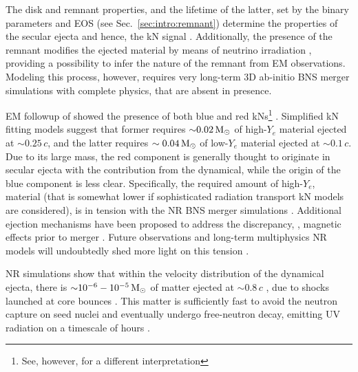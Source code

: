 The \pmerg{} disk and remnant properties, and the lifetime of the latter, set by the 
binary parameters and \ac{EOS} (see Sec.~\ref{sec:intro:remnant}) \citep{Radice:2018xqa,Perego:2019adq} 
determine the properties of the secular ejecta and hence, the \ac{kN} signal 
\citep[\eg][]{Radice:2018pdn}.
Additionally, the presence of the remnant modifies the ejected material by means of 
neutrino irradiation \citep{Fernandez:2015use}, providing a possibility to infer the nature of 
the remnant from \ac{EM} observations. Modeling this process, however, requires very long-term 
$3$D ab-initio \ac{BNS} merger simulations with complete physics, that are absent in presence.

\ac{EM} followup of \GW{} showed the presence of both blue and red \acp{kN}\footnote{
    See, however, \citet{Waxman:2017sqv} for a different interpretation
} \citep{Villar:2017wcc}.
Simplified \ac{kN} fitting models suggest that former requires ${\sim}0.02\,{\text{M}_{\odot}}$ of high-$Y_e$ 
material ejected at ${\sim0.25}\,c$, and the latter requires ${\sim0.04\,{\text{M}_{\odot}}}$ of low-$Y_e$ 
material ejected at ${\sim0.1}\,c$. Due to its large mass, the red component is 
generally thought to originate in secular ejecta with the contribution from the dynamical, while 
the origin of the blue component is less clear. Specifically, the required amount of high-$Y_e$,
material (that is somewhat lower if sophisticated radiation transport \ac{kN} models are considered),
is in tension with the \ac{NR} \ac{BNS} merger simulations 
\citep{Sekiguchi:2016bjd,Siegel:2019mlp,Perego:2017wtu,Kawaguchi:2018ptg}.
Additional ejection mechanisms have been proposed to address the discrepancy, \eg, 
magnetic effects prior to merger \citep{Metzger:2018qfl,Fernandez:2018kax,Radice:2018ghv}. 
Future observations and long-term multiphysics \ac{NR} models will undoubtedly shed more light on this tension \citep{Metzger:2018qfl}.

\ac{NR} simulations show that within the velocity distribution of the dynamical ejecta, 
there is ${\sim}10^{-6}-10^{-5}\,{\text{M}_{\odot}}$ of matter ejected at ${\sim}0.8\,c$ 
\citep{Metzger:2014yda,Hotokezaka:2018gmo,Radice:2018pdn,Radice:2018ghv}, due to shocks launched 
at core bounces \citep{Radice:2018pdn}.
This matter is sufficiently fast to avoid the neutron capture on seed nuclei 
and eventually undergo free-neutron decay, emitting 
\ac{UV} radiation on a timescale of hours \citep{Metzger:2014yda}. 

